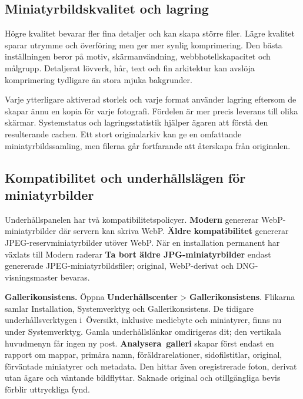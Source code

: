 \documentclass[11pt,a4paper]{article}
\newcommand{\ui}[1]{\textbf{#1}}
\begin{document}
\subsection{Miniatyrbildskvalitet och lagring}

Högre kvalitet bevarar fler fina detaljer och kan skapa större filer. Lägre
kvalitet sparar utrymme och överföring men ger mer synlig komprimering. Den
bästa inställningen beror på motiv, skärmanvändning, webbhotellskapacitet och
målgrupp. Detaljerat lövverk, hår, text och fin arkitektur kan avslöja
komprimering tydligare än stora mjuka bakgrunder.

Varje ytterligare aktiverad storlek och varje format använder lagring eftersom
de skapar ännu en kopia för varje fotografi. Fördelen är mer precis leverans
till olika skärmar. Systemstatus och lagringsstatistik hjälper ägaren att förstå
den resulterande cachen. Ett stort originalarkiv kan ge en omfattande
miniatyrbildssamling, men filerna går fortfarande att återskapa från originalen.

\subsection{Kompatibilitet och underhållslägen för miniatyrbilder}

Underhållspanelen har två kompatibilitetspolicyer. \ui{Modern} genererar
WebP-miniatyrbilder där servern kan skriva WebP. \ui{Äldre kompatibilitet}
genererar JPEG-reservminiatyrbilder utöver WebP. När en installation permanent
har växlats till Modern raderar \ui{Ta bort äldre JPG-miniatyrbilder} endast
genererade JPEG-miniatyrbildsfiler; original, WebP-derivat och
DNG-visningsmaster bevaras.

\textbf{Gallerikonsistens.} Öppna \ui{Underhållscenter} >
\ui{Gallerikonsistens}. Flikarna samlar Installation, Systemverktyg och
Gallerikonsistens. De tidigare underhållsverktygen i~Översikt, inklusive
mediebyte och miniatyrer, finns nu under Systemverktyg. Gamla underhållslänkar
omdirigeras dit; den vertikala huvudmenyn får ingen ny post.
\ui{Analysera~galleri} skapar först endast en rapport om mappar, primära namn,
föräldrarelationer, sidofilstitlar, original, förväntade miniatyrer och
metadata. Den hittar även oregistrerade foton, derivat utan ägare och väntande
bildflyttar. Saknade original och otillgängliga bevis förblir uttryckliga
fynd.
\end{document}
